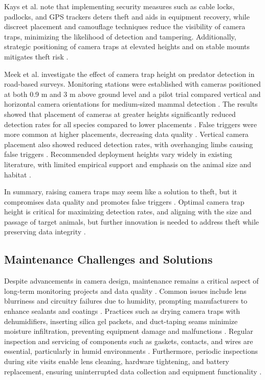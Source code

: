 Kays et al. \cite{kays2009camera} note that implementing security measures such as cable locks, padlocks, and GPS trackers deters theft and aids in equipment recovery, while discreet placement and camouflage techniques reduce the visibility of camera traps, minimizing the likelihood of detection and tampering. Additionally, strategic positioning of camera traps at elevated heights and on stable mounts mitigates theft risk \cite{kays2009camera}. 

Meek et al. \cite{meek2016higher} investigate the effect of camera trap height on predator detection in road-based surveys. Monitoring stations were established with cameras positioned at both 0.9 m and 3 m above ground level and a pilot trial compared vertical and horizontal camera orientations for medium-sized mammal detection \cite{meek2016higher}. The results showed that placement of cameras at greater heights significantly reduced detection rates for all species compared to lower placements \cite{meek2016higher}. False triggers were more common at higher placements, decreasing data quality \cite{meek2016higher}. Vertical camera placement also showed reduced detection rates, with overhanging limbs causing false triggers \cite{meek2016higher}. Recommended deployment heights vary widely in existing literature, with limited empirical support and emphasis on the animal size and habitat \cite{meek2016higher}. 

In summary, raising camera traps may seem like a solution to theft, but it compromises data quality and promotes false triggers \cite{meek2016higher}. Optimal camera trap height is critical for maximizing detection rates, and aligning with the size and passage of target animals, but further innovation is needed to address theft while preserving data integrity \cite{meek2016higher}. 

\subsection{Maintenance Challenges and Solutions}

Despite advancements in camera design, maintenance remains a critical aspect of long-term monitoring projects and data quality \cite{kays2009camera}. Common issues include lens blurriness and circuitry failures due to humidity, prompting manufacturers to enhance sealants and coatings \cite{kays2009camera}. Practices such as drying camera traps with dehumidifiers, inserting silica gel packets, and duct-taping seams minimize moisture infiltration, preventing equipment damage and malfunctions \cite{glover2019camera}.  Regular inspection and servicing of components such as gaskets, contacts, and wires are essential, particularly in humid environments \cite{glover2019camera}. Furthermore, periodic inspections during site visits enable lens cleaning, hardware tightening, and battery replacement, ensuring uninterrupted data collection and equipment functionality \cite{glover2019camera}. 


